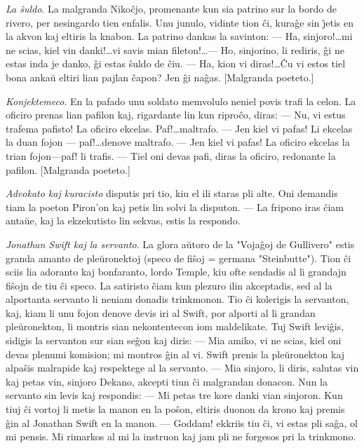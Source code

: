 \emph{La \^suldo}. La malgranda Niko\^cjo, promenante kun sia
patrino sur la bordo de rivero, per nesingardo tien enfalis. Unu
junulo, vidinte tion \^ci, kura\^ge sin \^{\j}etis en la akvon kaj
eltiris la knabon. La patrino dankas la savinton: --- Ha,
sinjoro!\dots mi ne scias, kiel vin danki!\dots vi savis mian
fileton!\dots --- Ho, sinjorino, li rediris, \^gi ne estas inda je
danko, \^gi estas \^suldo de \^ciu. --- Ha, kion vi diras!\dots \^Cu
vi estos tiel bona anka\u u eltiri lian pajlan \^capon? Jen \^gi
na\^gas. [Malgranda poeteto.]

\emph{Konjektemeco}. En la pafado unu soldato memvolulo neniel povis
trafi la celon. La oficiro prenas lian pafilon kaj, rigardante lin
kun ripro\^co, diras: --- Nu, vi estus trafema pafisto! La oficiro
ekcelas. Paf!\dots maltrafo. --- Jen kiel vi pafas! Li ekcelas la
duan fojon --- paf!\dots denove maltrafo. --- Jen kiel vi pafas! La
oficiro ekcelas la trian fojon---paf! li trafis. --- Tiel oni devas
pafi, diras la oficiro, redonante la pafilon. [Malgranda poeteto.]

\emph{Advokato kaj kuracisto} disputis pri tio, kiu el ili staras
pli alte. Oni demandis tiam la poeton Piron'on kaj petis lin solvi
la disputon. --- La fripono iras \^ciam anta\u ue, kaj la
ekzekutisto lin sekvas, estis la respondo.

\emph{Jonathan Swift kaj la servanto}. La glora a\u utoro de la
"Voja\^goj de Gullivero" estis granda amanto de ple\u uronektoj
(speco de fi\^soj = germana "Steinbutte"). Tion \^ci sciis lia
adoranto kaj bonfaranto, lordo Temple, kiu ofte sendadis al li
grandajn fi\^sojn de tiu \^ci speco. La satiristo \^ciam kun plezuro
ilin akceptadis, sed al la alportanta servanto li neniam donadis
trinkmonon. Tio \^ci kolerigis la servanton, kaj, kiam li unu fojon
denove devis iri al Swift, por alporti al li grandan ple\u
uronekton, li montris sian nekontentecon iom maldelikate. Tuj Swift
levi\^gis, sidigis la servanton sur sian se\^gon kaj diris: --- Mia
amiko, vi ne scias, kiel oni devas plenumi komision; mi montros
\^gin al vi. Swift prenis la ple\u uronekton kaj alpa\^sis malrapide
kaj respektege al la servanto. --- Mia sinjoro, li diris, salutas
vin kaj petas vin, sinjoro Dekano, akcepti tiun \^ci malgrandan
donacon. Nun la servanto sin levis kaj respondis: --- Mi petas tre
kore danki vian sinjoron. Kun tiuj \^ci vortoj li metis la manon en
la po\^son, eltiris duonon da krono kaj premis \^gin al Jonathan
Swift en la manon. --- Goddam! ekkriis tiu \^ci, vi estas pli
sa\^ga, ol mi pensis. Mi rimarkos al mi la instruon kaj jam pli ne
forgesos pri la trinkmono.

